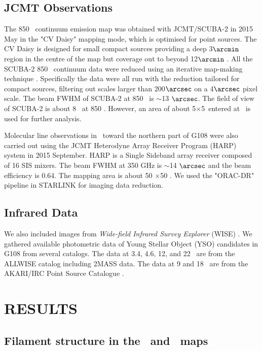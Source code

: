 \documentclass[manuscript]{aastex}
\begin{document}
\subsection{JCMT Observations}
The 850 \m\ continuum emission map was obtained with JCMT/SCUBA-2 in 2015 May in the "CV Daisy" mapping mode, which is optimised for point sources.
The CV Daisy is designed for small compact sources providing a deep 3$\arcmin$ region in the centre of the map but coverage out to beyond 12$\arcmin$ \citep{bint14}.  
All the SCUBA-2 850 \m\ continuum data were reduced using an iterative map-making technique \citep{chap13}. 
Specifically the data were all run with the reduction tailored for compact sources, filtering out scales larger than 200$\arcsec$ on a 4$\arcsec$ pixel scale.
The beam FWHM of SCUBA-2 at 850 \m\ is $\sim$13 $\arcsec$.
The field of view of SCUBA-2 is about 8 \arcmin\ at 850 \m.
However, an area of about 5\arcmin$\times$5\arcmin\ entered at \sou\ is used for further analysis.

Molecular line observations in \hcopf\ toward the northern part of G108 were also carried out using the JCMT Heterodyne Array Receiver Program (HARP) system in 2015 September.
HARP is a Single Sideband array receiver composed of 16 SIS mixers.
The beam FWHM at 350 GHz is $\sim$14 $\arcsec$ and the beam efficiency is 0.64.
The mapping area is about 50 \arcsec$\times$50 \arcsec.
We used the "ORAC-DR" pipeline in STARLINK for imaging data reduction.

\subsection{Infrared Data}

We also included images from \textit{Wide-field Infrared Survey Explorer} (WISE) \citep{wright10}.
We gathered available photometric data of Young Stellar Object (YSO) candidates in G108 from several catalogs.
The data at 3.4, 4.6, 12, and 22 \m\ are from the ALLWISE catalog including 2MASS data.
The data at 9 and 18 \m\ are from the AKARI/IRC Point Source Catalogue \citep[AKARIPSC;][]{ishihara10}.

\section{RESULTS}


\subsection{Filament structure in the \tco\ and \thco\ maps}
\end{document}
